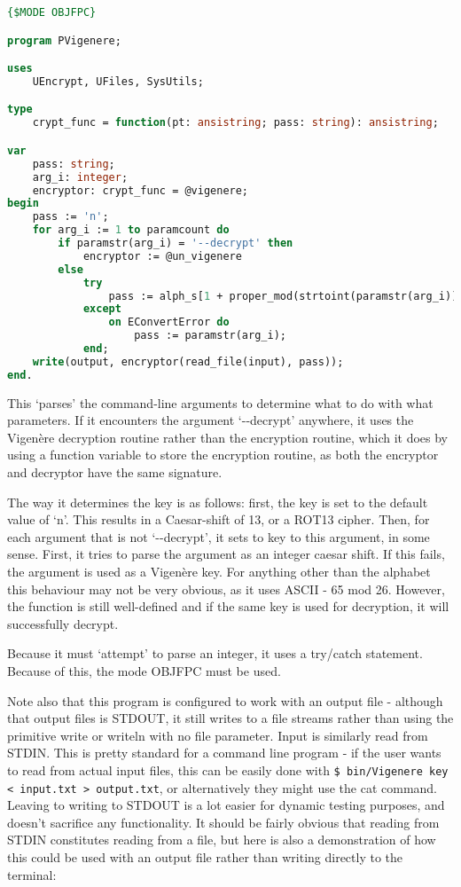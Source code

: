 \documentclass{article}
\begin{document}
\begin{lstlisting}[language=Pascal, caption=Command-line interface for Vigen\`ere routines (PVigenere.pas)]
{$MODE OBJFPC}

program PVigenere;

uses
    UEncrypt, UFiles, SysUtils;

type
    crypt_func = function(pt: ansistring; pass: string): ansistring;

var
    pass: string;
    arg_i: integer;
    encryptor: crypt_func = @vigenere;
begin
    pass := 'n';
    for arg_i := 1 to paramcount do
        if paramstr(arg_i) = '--decrypt' then
            encryptor := @un_vigenere
        else
            try
                pass := alph_s[1 + proper_mod(strtoint(paramstr(arg_i)), 26)];
            except
                on EConvertError do
                    pass := paramstr(arg_i);
            end;
    write(output, encryptor(read_file(input), pass));
end.
\end{lstlisting}
\iffalse $ \fi %

    This `parses' the command-line arguments to determine what to do with what
    parameters. If it encounters the argument `-{}-decrypt' anywhere, it uses the
    Vigen\`ere decryption routine rather than the encryption routine, which it
    does by using a function variable to store the encryption routine, as both
    the encryptor and decryptor have the same signature.

    The way it determines the key is as follows: first, the key is set to the
    default value of `n'. This results in a Caesar-shift of 13, or a ROT13
    cipher. Then, for each argument that is not `-{}-decrypt', it sets to key to
    this argument, in some sense. First, it tries to parse the argument as an
    integer caesar shift. If this fails, the argument is used as a Vigen\`ere
    key. For anything other than the alphabet this behaviour may not be very
    obvious, as it uses ASCII - 65 mod 26. However, the function is still
    well-defined and if the same key is used for decryption, it will
    successfully decrypt.

    Because it must `attempt' to parse an integer, it uses a try/catch
    statement. Because of this, the mode OBJFPC must be used.

    Note also that this program is configured to work with an output file -
    although that output files is STDOUT, it still writes to a file streams
    rather than using the primitive write or writeln with no file parameter.
    Input is similarly read from STDIN. This is pretty standard for a command
    line program - if the user wants to read from actual input files, this can
    be easily done with \verb|$ bin/Vigenere key < input.txt > output.txt|, or
    alternatively they might use the cat command. Leaving to writing to STDOUT
    is a lot easier for dynamic testing purposes, and doesn't sacrifice any
    functionality.  It should be fairly obvious that reading from STDIN
    constitutes reading from a file, but here is also a demonstration of how
    this could be used with an output file rather than writing directly to the
    terminal:
\end{document}
